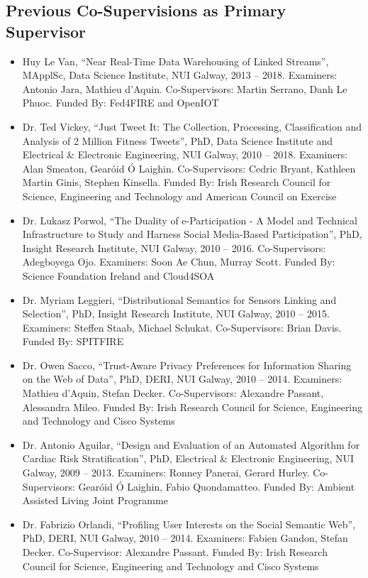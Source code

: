 \documentclass[10pt,a4paper]{res} %
\begin{document}
\begin{resume}
\subsection*{Previous Co-Supervisions as Primary Supervisor}

\begin{itemize} \itemsep -2pt
\item Huy Le Van, ``Near Real-Time Data Warehousing of Linked Streams'', MApplSc, Data Science Institute, NUI Galway, 2013 -- 2018. Examiners: Antonio Jara, Mathieu d'Aquin. Co-Supervisors: Martin Serrano, Danh Le Phuoc. Funded By: Fed4FIRE and OpenIOT
\item Dr. Ted Vickey, ``Just Tweet It: The Collection, Processing, Classification and Analysis of 2 Million Fitness Tweets'', PhD, Data Science Institute and Electrical \& Electronic Engineering, NUI Galway, 2010 -- 2018. Examiners: Alan Smeaton, Gear\'{o}id \'{O} Laighin. Co-Supervisors: Cedric Bryant, Kathleen Martin Ginis, Stephen Kinsella. Funded By: Irish Research Council for Science, Engineering and Technology and American Council on Exercise %
\item Dr. Lukasz Porwol, ``The Duality of e-Participation - A Model and Technical Infrastructure to Study and Harness Social Media-Based Participation'', PhD, Insight Research Institute, NUI Galway, 2010 -- 2016. Co-Supervisors: Adegboyega Ojo. Examiners: Soon Ae Chun, Murray Scott. Funded By: Science Foundation Ireland and Cloud4SOA
\item Dr. Myriam Leggieri, ``Distributional Semantics for Sensors Linking and Selection'', PhD, Insight Research Institute, NUI Galway, 2010 -- 2015. Examiners: Steffen Staab, Michael Schukat. Co-Supervisors: Brian Davis. Funded By: SPITFIRE %
\item Dr. Owen Sacco, ``Trust-Aware Privacy Preferences for Information Sharing on the Web of Data'', PhD, DERI, NUI Galway, 2010 -- 2014. Examiners: Mathieu d'Aquin, Stefan Decker. Co-Supervisors: Alexandre Passant, Alessandra Mileo. Funded By: Irish Research Council for Science, Engineering and Technology and Cisco Systems %
\item Dr. Antonio Aguilar, ``Design and Evaluation of an Automated Algorithm for Cardiac Risk Stratification'', PhD, Electrical \& Electronic Engineering, NUI Galway, 2009 -- 2013. Examiners: Ronney Panerai, Gerard Hurley. Co-Supervisors: Gear\'{o}id \'{O} Laighin, Fabio Quondamatteo. Funded By: Ambient Assisted Living Joint Programme %
\item Dr. Fabrizio Orlandi, ``Profiling User Interests on the Social Semantic Web'', PhD, DERI, NUI Galway, 2010 -- 2014. Examiners: Fabien Gandon, Stefan Decker. Co-Supervisor: Alexandre Passant. Funded By: Irish Research Council for Science, Engineering and Technology and Cisco Systems %

\end{itemize}
\end{resume}
\end{document}
